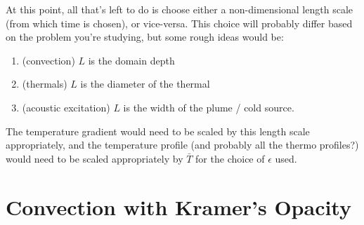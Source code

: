 At this point, all that's left to do is choose either a non-dimensional length scale (from which
time is chosen), or vice-versa. This choice will probably differ based on the problem you're
studying, but some rough ideas would be:
\begin{enumerate}
\item (convection) $L$ is the domain depth
\item (thermals)   $L$ is the diameter of the thermal
\item (acoustic excitation) $L$ is the width of the plume / cold source.
\end{enumerate}
The temperature gradient would need to be scaled by this length scale appropriately, and the 
temperature profile (and probably all the thermo profiles?) would need to be scaled appropriately
by $\bar{T}$ for the choice of $\epsilon$ used.



\section{Convection with Kramer's Opacity}
